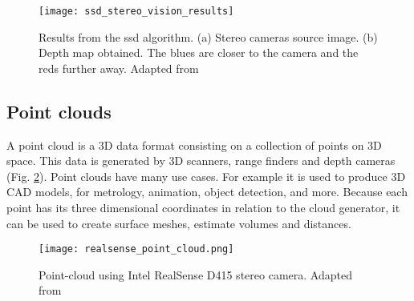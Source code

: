 \begin{figure}[htbp]
	\centering
	\texttt{[image: ssd\_stereo\_vision\_results]}
	\caption[Results from the \gls{ssd} algorithm.]{Results from the \gls{ssd} algorithm. (a) Stereo cameras source image. (b) Depth map obtained. The blues are closer to the camera and the reds further away. Adapted from \cite{IntelRealSense_basics_depth_vision}}
	\label{fig:ssd_stereo_vision_results}
\end{figure}


\subsection{Point clouds}
\label{subsec:point_clouds}

A point cloud is a 3D data format consisting on a collection of points on 3D space. This data is generated by 3D scanners, range finders and depth cameras (Fig. \ref{fig:realsense_point_cloud}). Point clouds have many use cases. For example it is used to produce 3D CAD models, for metrology, animation, object detection, and more. Because each point has its three dimensional coordinates in relation to the cloud generator, it can be used to create surface meshes, estimate volumes and distances.

\begin{figure}[htbp]
	\centering
	\texttt{[image: realsense\_point\_cloud.png]}
	\caption[Point-cloud using Intel RealSense D415 stereo camera.]{Point-cloud using Intel RealSense D415 stereo camera. Adapted from \cite{IntelRealSense_basics_depth_vision}}
	\label{fig:realsense_point_cloud}
\end{figure}


